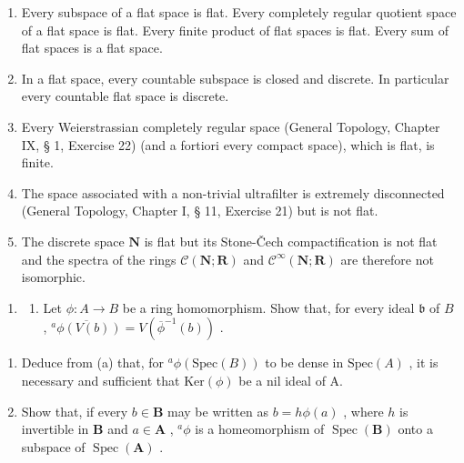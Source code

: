 \begin{enumerate}
\def\labelenumi{(\alph{enumi})}
\setcounter{enumi}{1}
\item
  Every subspace of a flat space is flat. Every completely regular quotient space of a flat space is flat. Every finite product of flat spaces is flat. Every sum of flat spaces is a flat space.
\item
  In a flat space, every countable subspace is closed and discrete. In particular every countable flat space is discrete.
\item
  Every Weierstrassian completely regular space (General Topology, Chapter IX, § 1, Exercise 22) (and a fortiori every compact space), which is flat, is finite.
\item
  The space associated with a non-trivial ultrafilter is extremely disconnected (General Topology, Chapter I, § 11, Exercise 21) but is not flat.
\item
  The discrete space \(\mathbf{N}\) is flat but its Stone-Čech compactification is not flat and the spectra of the rings \(\mathcal{C}(\mathbf{N};\mathbf{R})\) and \(\mathcal{C}^{\infty}(\mathbf{N};\mathbf{R})\) are therefore not isomorphic.
\end{enumerate}

\begin{enumerate}
\def\labelenumi{\arabic{enumi}.}
\setcounter{enumi}{18}
\tightlist
\item
  \begin{enumerate}
  \def\labelenumii{(\alph{enumii})}
  \tightlist
  \item
    Let \(\phi: A \to B\) be a ring homomorphism. Show that, for every ideal \(\mathfrak{b}\) of \(B\) , \(\overline{^a\phi(V(b))} = V(\overline{\phi}^{-1}(b))\) .
  \end{enumerate}
\end{enumerate}

\begin{enumerate}
\def\labelenumi{(\alph{enumi})}
\setcounter{enumi}{1}
\item
  Deduce from (a) that, for \(^{a}\phi(\text{Spec}(B))\) to be dense in \(\text{Spec}(A)\) , it is necessary and sufficient that \(\text{Ker}(\phi)\) be a nil ideal of A.
\item
  Show that, if every \(b \in \mathbf{B}\) may be written as \(b = h\phi(a)\) , where \(h\) is invertible in \(\mathbf{B}\) and \(a \in \mathbf{A}\) , \(^a\phi\) is a homeomorphism of \(\operatorname{Spec}(\mathbf{B})\) onto a subspace of \(\operatorname{Spec}(\mathbf{A})\) .
\end{enumerate}

